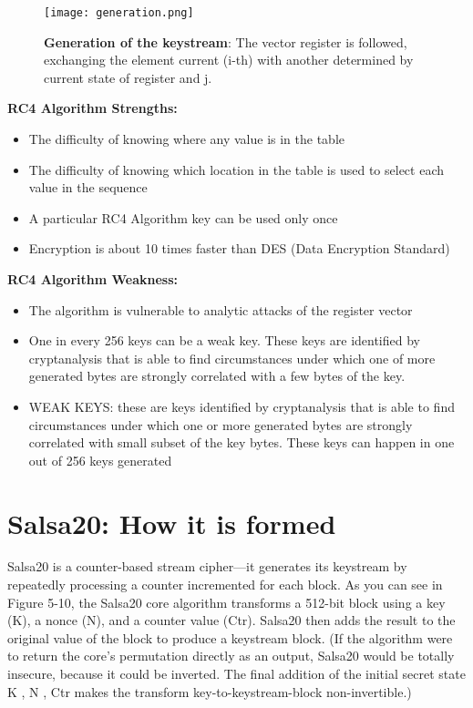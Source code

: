 \documentclass{article}
\begin{document}
\newpage
\begin{figure}[htb]
	\begin{center}
  		\texttt{[image: generation.png]}
 	\end{center}
 	\caption{\textbf{Generation of the keystream}: The vector register is followed, exchanging the element current (i-th) with another determined by current state of register and j.}
 	\label{ciphering}
\end{figure}
\textbf{RC4 Algorithm Strengths: }
\begin{itemize}
\item The difficulty of knowing where any value is in the table
\item The difficulty of knowing which location in the table is used to select each value in the sequence
\item A particular RC4 Algorithm key can be used only once
\item Encryption is about 10 times faster than DES (Data Encryption Standard)
\end{itemize}
\textbf{RC4 Algorithm Weakness: }
\begin{itemize}
\item The algorithm is vulnerable to analytic attacks of the register vector
\item One in every 256 keys can be a weak key. These keys are identified by cryptanalysis that is able to find circumstances under which one of more generated bytes are strongly correlated with a few bytes of the key. 
\item WEAK KEYS: these are keys identified by cryptanalysis that is able to find circumstances under which one or more generated bytes are strongly correlated with small subset of the key bytes. These keys can happen in one out of 256 keys generated
\end{itemize}

\section{Salsa20: How it is formed}

 



Salsa20 is a counter-based stream cipher—it generates its keystream by
repeatedly processing a counter incremented for each block. As you can
see in Figure 5-10, the Salsa20 core algorithm transforms a 512-bit block
using a key (K), a nonce (N), and a counter value (Ctr). Salsa20 then adds
the result to the original value of the block to produce a keystream block.
(If the algorithm were to return the core’s permutation directly as an
output, Salsa20 would be totally insecure, because it could be inverted.
The final addition of the initial secret state K , N , Ctr makes the
transform key-to-keystream-block non-invertible.)
\end{document}
